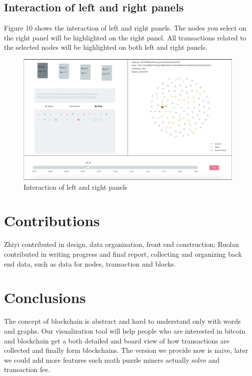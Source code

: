 \documentclass[journal, a4paper]{IEEEtran}
\begin{document}
\subsection{Interaction of left and right panels}
Figure 10 shows the interaction of left and right panels. The nodes you select on the right panel will be highlighted on the right panel. All transactions related to the selected nodes will be highlighted on both left and right panels.
\begin{figure}[!hbt]
		\begin{center}
		\includegraphics[width=\columnwidth]{clicknodes.png}
		\caption{Interaction of left and right panels}
		\label{fig:clicknodes}
		\end{center}
	\end{figure}

\section{Contributions}
Zhiyi contributed in design, data organization, front end construction; Ruolan contributed in writing progress and final report, collecting and organizing back end data, such as data for nodes, transaction and blocks.

\section{Conclusions}
The concept of blockchain is abstract and hard to understand only with words and graphs. Our visualization tool will help people who are interested in bitcoin and blockchain get a both detailed and board view of how transactions are collected and finally form blockchains. The version we provide now is naive, later we could add more features such math puzzle miners actually solve and transaction fee.
\end{document}
